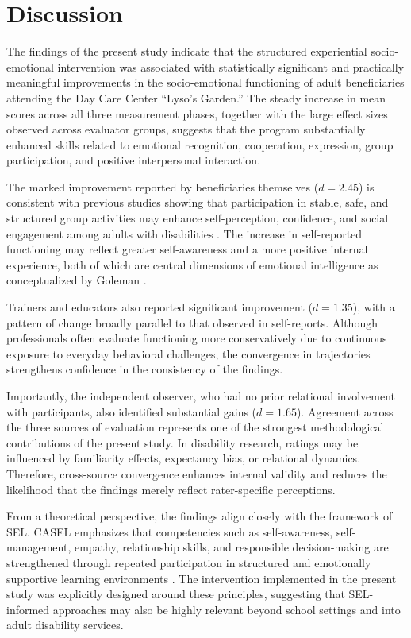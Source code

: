 \documentclass[journal]{IEEEtran}
\begin{document}
\section{Discussion}

The findings of the present study indicate that the structured experiential socio-emotional intervention was associated with statistically significant and practically meaningful improvements in the socio-emotional functioning of adult beneficiaries attending the Day Care Center ``Lyso's Garden.'' The steady increase in mean scores across all three measurement phases, together with the large effect sizes observed across evaluator groups, suggests that the program substantially enhanced skills related to emotional recognition, cooperation, expression, group participation, and positive interpersonal interaction.

The marked improvement reported by beneficiaries themselves ($d = 2.45$) is consistent with previous studies showing that participation in stable, safe, and structured group activities may enhance self-perception, confidence, and social engagement among adults with disabilities \cite{hall2009,verdonschot2009}. The increase in self-reported functioning may reflect greater self-awareness and a more positive internal experience, both of which are central dimensions of emotional intelligence as conceptualized by Goleman \cite{goleman1995}.

Trainers and educators also reported significant improvement ($d = 1.35$), with a pattern of change broadly parallel to that observed in self-reports. Although professionals often evaluate functioning more conservatively due to continuous exposure to everyday behavioral challenges, the convergence in trajectories strengthens confidence in the consistency of the findings.

Importantly, the independent observer, who had no prior relational involvement with participants, also identified substantial gains ($d = 1.65$). Agreement across the three sources of evaluation represents one of the strongest methodological contributions of the present study. In disability research, ratings may be influenced by familiarity effects, expectancy bias, or relational dynamics. Therefore, cross-source convergence enhances internal validity and reduces the likelihood that the findings merely reflect rater-specific perceptions.

From a theoretical perspective, the findings align closely with the framework of SEL. CASEL emphasizes that competencies such as self-awareness, self-management, empathy, relationship skills, and responsible decision-making are strengthened through repeated participation in structured and emotionally supportive learning environments \cite{casel2020,weissberg2015}. The intervention implemented in the present study was explicitly designed around these principles, suggesting that SEL-informed approaches may also be highly relevant beyond school settings and into adult disability services.
\end{document}
